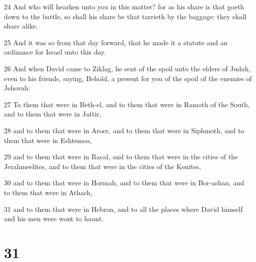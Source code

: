 \par 24 And who will hearken unto you in this matter? for as his share is that goeth down to the battle, so shall his share be that tarrieth by the baggage: they shall share alike.
\par 25 And it was so from that day forward, that he made it a statute and an ordinance for Israel unto this day.
\par 26 And when David came to Ziklag, he sent of the spoil unto the elders of Judah, even to his friends, saying, Behold, a present for you of the spoil of the enemies of Jehovah:
\par 27 To them that were in Beth-el, and to them that were in Ramoth of the South, and to them that were in Jattir,
\par 28 and to them that were in Aroer, and to them that were in Siphmoth, and to them that were in Eshtemoa,
\par 29 and to them that were in Racal, and to them that were in the cities of the Jerahmeelites, and to them that were in the cities of the Kenites,
\par 30 and to them that were in Hormah, and to them that were in Bor-ashan, and to them that were in Athach,
\par 31 and to them that were in Hebron, and to all the places where David himself and his men were wont to haunt.

\chapter{31}


